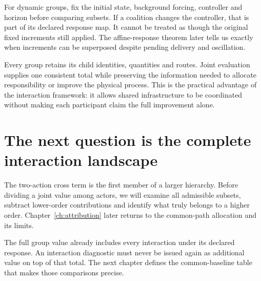 For dynamic groups, fix the initial state, background forcing, controller and horizon before comparing subsets. If a coalition changes the controller, that is part of its declared response map. It cannot be treated as though the original fixed increments still applied. The affine-response theorem later tells us exactly when increments can be superposed despite pending delivery and oscillation.

Every group retains its child identities, quantities and routes. Joint evaluation supplies one consistent total while preserving the information needed to allocate responsibility or improve the physical process. This is the practical advantage of the interaction framework: it allows shared infrastructure to be coordinated without making each participant claim the full improvement alone.

\section{The next question is the complete interaction landscape}
The two-action cross term is the first member of a larger hierarchy. Before dividing a joint value among actors, we will examine all admissible subsets, subtract lower-order contributions and identify what truly belongs to a higher order. Chapter~\ref{ch:attribution} later returns to the common-path allocation and its limits.

The full group value already includes every interaction under its declared response. An interaction diagnostic must never be issued again as additional value on top of that total. The next chapter defines the common-baseline table that makes those comparisons precise.
